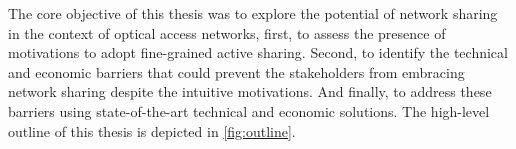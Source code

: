 




The core objective of this thesis was to explore the potential of network sharing in the context of optical access networks, first, to assess the presence of motivations to adopt fine-grained active sharing. Second, to identify the technical and economic barriers that could prevent the stakeholders from embracing network sharing despite the intuitive motivations. And finally, to address these barriers using state-of-the-art technical and economic solutions. The high-level outline of this thesis is depicted in \autoref{fig:outline}.


